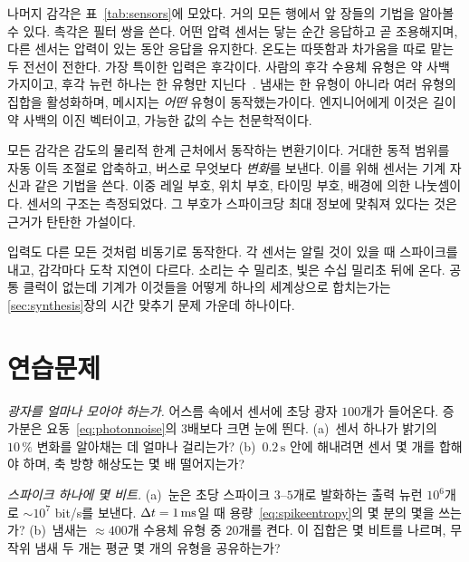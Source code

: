 나머지 감각은 표~\ref{tab:sensors}에 모았다. 거의 모든 행에서 앞 장들의 기법을 알아볼 수 있다. 촉각은 필터 쌍을 쓴다. 어떤 압력 센서는 닿는 순간 응답하고 곧 조용해지며, 다른 센서는 압력이 있는 동안 응답을 유지한다. 온도는 따뜻함과 차가움을 따로 맡는 두 전선이 전한다. 가장 특이한 입력은 후각이다. 사람의 후각 수용체 유형은 약 사백 가지이고, 후각 뉴런 하나는 한 유형만 지닌다~\cite{Mombaerts2004}. 냄새는 한 유형이 아니라 여러 유형의 집합을 활성화하며, 메시지는 \emph{어떤} 유형이 동작했는가이다. 엔지니어에게 이것은 길이 약 사백의 이진 벡터이고, 가능한 값의 수는 천문학적이다.

\begin{keyblock}
\begin{proposition}[기계의 입력]
\label{prop:sensors}
모든 감각은 감도의 물리적 한계 근처에서 동작하는 변환기이다. 거대한 동적 범위를 자동 이득 조절로 압축하고,  버스로 무엇보다 \emph{변화}를 보낸다. 이를 위해 센서는 기계 자신과 같은 기법을 쓴다. 이중 레일 부호, 위치 부호, 타이밍 부호, 배경에 의한 나눗셈이다. 센서의 구조는 측정되었다. 그 부호가 스파이크당 최대 정보에 맞춰져 있다는 것은 근거가 탄탄한 가설이다.
\end{proposition}
\end{keyblock}

입력도 다른 모든 것처럼 비동기로 동작한다. 각 센서는 알릴 것이 있을 때 스파이크를 내고, 감각마다 도착 지연이 다르다. 소리는 수 밀리초, 빛은 수십 밀리초 뒤에 온다. 공통 클럭이 없는데 기계가 이것들을 어떻게 하나의 세계상으로 합치는가는 \ref{sec:synthesis}장의 시간 맞추기 문제 가운데 하나이다.

\section{연습문제}

\begin{exercise}[\lvlA]
\label{ex:11:1}
\emph{광자를 얼마나 모아야 하는가.} 어스름 속에서 센서에 초당 광자 $100$개가 들어온다. 증가분은 요동~\eqref{eq:photonnoise}의 $3$배보다 크면 눈에 띈다. (a)~센서 하나가 밝기의 $10\,\%$ 변화를 알아채는 데 얼마나 걸리는가? (b)~$0.2\,\text{s}$ 안에 해내려면 센서 몇 개를 합해야 하며, 축 방향 해상도는 몇 배 떨어지는가?
\end{exercise}

\begin{exercise}[\lvlA]
\label{ex:11:2}
\emph{스파이크 하나에 몇 비트.} (a)~눈은 초당 스파이크 $3$--$5$개로 발화하는 출력 뉴런 $10^6$개로 $\sim10^7$ bit/s를 보낸다. $\Delta t=1\,\text{ms}$일 때 용량~\eqref{eq:spikeentropy}의 몇 분의 몇을 쓰는가? (b)~냄새는 $\approx400$개 수용체 유형 중 $20$개를 켠다. 이 집합은 몇 비트를 나르며, 무작위 냄새 두 개는 평균 몇 개의 유형을 공유하는가?
\end{exercise}

